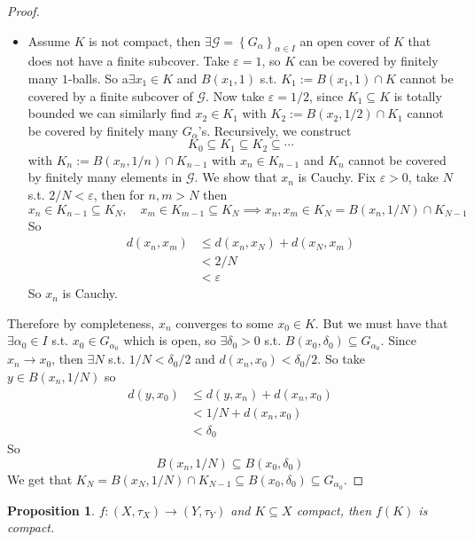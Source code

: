 \documentclass[11pt,a4paper]{article}
\theoremstyle{definition}
\theoremstyle{plain}
\newtheorem{proposition}[definition]{Proposition}
\theoremstyle{remark}
\renewcommand{\set}[1]{\left\{ #1 \right\}}
\newcommand{\1}{\mathbbm{1}}
\begin{document}
\begin{proof}
\begin{itemize}
        \item[$(iv) \implies (i)$] Assume $K$ is not compact, then $\exists \mathcal{G} = \set{G_\alpha}_{\alpha \in I}$ an open cover of $K$ that does not have a finite subcover. 
        Take $\varepsilon = 1$, so $K$ can be covered by finitely many $1$-balls. So a$\exists x_1 \in K$ and $B(x_1, 1)$ s.t. 
        $K_1 := B(x_1, 1) \cap K$ cannot be covered by a finite subcover of $\mathcal{G}$. Now take $\varepsilon = 1/2$, since $K_1 \subseteq K$ is totally bounded we can similarly find $x_2 \in K_1$ with 
        $K_2 := B(x_2, 1/2) \cap K_1$ cannot be covered by finitely many $G_\alpha$'s. Recursively, we construct 
        $$K_0 \subseteq K_1 \subseteq K_2 \subseteq \cdots$$
        with $K_n := B(x_n, 1/n) \cap K_{n-1}$ with $x_{n} \in K_{n-1}$ and $K_n$ cannot be covered by finitely many elements in $\mathcal{G}$. We show that $x_n$ is Cauchy. 
        Fix $\varepsilon > 0$, take $N$ s.t. $2/N < \varepsilon$, then for $n, m > N$ then 
        $$x_n \in K_{n-1} \subseteq K_N, \quad x_m \in K_{m-1} \subseteq K_N \implies x_n, x_m \in K_N = B(x_{n}, 1/N) \cap K_{N-1}$$
        So 
        \begin{align*}
            d(x_n, x_m) &\le d(x_n, x_N) + d(x_N, x_m) \\
            &< 2/N\\
            &< \varepsilon
        \end{align*}
        So $x_n$ is Cauchy.
    \end{itemize}
    Therefore by completeness, $x_n$ converges to some $x_0 \in K$. But we must have that $\exists \alpha_0 \in I$ s.t. 
    $x_0 \in G_{\alpha_0}$ which is open, so $\exists \delta_0 > 0$ s.t. $B(x_0, \delta_0) \subseteq G_{\alpha_0}$. Since $x_n \to x_0$, then $\exists N$ s.t. 
    $1/N < \delta_0/2$ and $d(x_n, x_0) < \delta_0/2$. So take $y \in B(x_n, 1/N)$ so 
    \begin{align*}
        d(y,x_0) &\le d(y,x_n) + d(x_n, x_0) \\
        &< 1/N + d(x_n, x_0) \\
        &< \delta_0
    \end{align*}
    So 
    $$B(x_n, 1/N) \subseteq B(x_0, \delta_0)$$
    We get that $K_N = B(x_N, 1/N) \cap K_{N-1} \subseteq B(x_0, \delta_0) \subseteq G_{\alpha_0}$. 
\end{proof}

\begin{proposition}
    $f \colon (X, \tau_X) \to (Y, \tau_Y)$ and $K \subseteq X$ compact, then $f(K)$ is compact.
\end{proposition}
\end{document}

